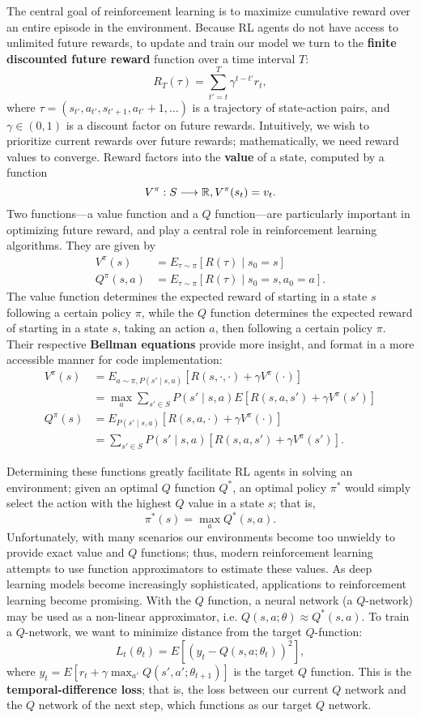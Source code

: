 \documentclass{article} %
\begin{document}
The central goal of reinforcement learning is to maximize cumulative reward over an entire episode
in the environment. Because RL agents do not have access to unlimited future rewards, to update and
train our model we turn to the \textbf{finite discounted future reward} function over a time
interval $T$: \[
  R_T(\tau)=\sum_{t'=t}^{T} \gamma^{t-t'}r_t
,\] where $\tau=(s_{t'}, a_{t'}, s_{t'+1}, a_{t'}+1, \ldots)$ is a trajectory of state-action pairs,
and $\gamma\in (0,1)$ is a discount factor on future rewards. Intuitively, we wish to prioritize
current rewards over future rewards; mathematically, we need reward values to converge. Reward
factors into the \textbf{value} of a state, computed by a function \[
  V^{\pi}:S\longrightarrow \mathbb{R}, V^{\pi}(s_t)=v_t
.\] Two functions---a value function and a $Q$ function---are particularly important in optimizing
future reward, and play a central role in reinforcement learning algorithms. They are given by
\begin{align*}
  V^{\pi}(s)&=E_{\tau\sim \pi}[R(\tau)\mid s_0=s]\\
  Q^{\pi}(s, a)&=E_{\tau\sim \pi}[R(\tau)\mid s_0=s, a_0=a]
.\end{align*} The value function determines the expected reward of starting in a state
$s$ following a certain policy $\pi$, while the $Q$ function determines the expected reward of
starting in a state $s$, taking an action $a$, then following a certain policy $\pi$. Their
respective \textbf{Bellman equations} provide more insight, and format in a more accessible manner
for code implementation:
\begin{align*}
    V^{\pi}(s)&= E_{a\sim \pi, P(s'\mid s,a)}[R(s, \cdot , \cdot )+\gamma V^{\pi}(\cdot )] \\
              &= \max_a \sum_{s'\in S} P(s'\mid s,a)E[R(s,a,s')+\gamma V^\pi(s')] \\
    Q^\pi(s) &= E_{P(s'\mid s,a)}[R(s,a,\cdot)+\gamma V^{\pi}(\cdot )] \\
             &= \sum_{s'\in S} P(s'\mid s,a)[R(s,a,s')+\gamma V^\pi(s')]
.\end{align*}

Determining these functions greatly facilitate RL agents in solving an environment; given an optimal
$Q$ function $Q^*$, an optimal policy $\pi^*$ would simply select the action with the highest $Q$
value in a state $s$; that is, \[
  \pi^*(s)=\max_a Q^*(s,a)
.\] Unfortunately, with many scenarios our environments become too unwieldy to provide exact value
and $Q$ functions; thus, modern reinforcement learning attempts to use function approximators to
estimate these values. As deep learning models become increasingly sophisticated, applications to
reinforcement learning become promising. With the $Q$ function, a neural network (a $Q$-network) may
be used as a non-linear approximator, i.e. $Q(s, a; \theta)\approx Q^*(s,a)$. To train a
$Q$-network, we want to minimize distance from the target $Q$-function: \[
  L_t(\theta_t)=E[(y_t-Q(s,a;\theta_t))^2]
,\] where $y_t=E[r_t+\gamma\max_{a'} Q(s',a';\theta_{t+1})]$ is the target $Q$ function. This is the
\textbf{temporal-difference loss}; that is, the loss between our current $Q$ network and the $Q$
network of the next step, which functions as our target $Q$ network.
\end{document}
